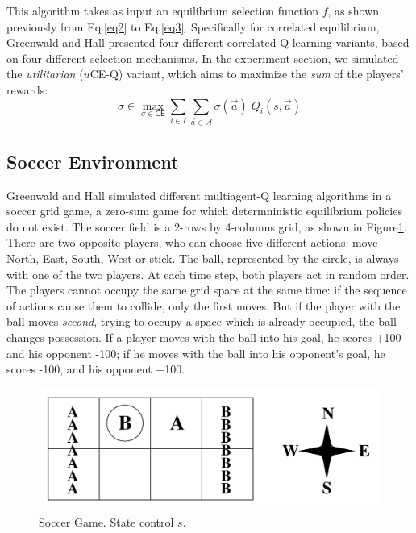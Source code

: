 \documentclass{article}
\begin{document}
    This algorithm takes as input an equilibrium selection function $f$, as shown previously from Eq.\ref{eq2} to Eq.\ref{eq3}.
    Specifically for correlated equilibrium, Greenwald and Hall presented four different correlated-Q learning variants, based on four different selection mechanisms.
    In the experiment section, we simulated the \emph{utilitarian} ($u$CE-Q) variant, which aims to maximize the \emph{sum} of the players' rewards:
    \begin{equation}
        \sigma \in \max_{\sigma \in \mathsf{CE}} \sum_{i \in I} \sum_{\vec{a} \in \mathcal{A}} \sigma(\vec{a}) \; Q_{i}(s, \vec{a})
    \end{equation}

    \subsection{Soccer Environment}
    \label{subsec:soccer}
    Greenwald and Hall simulated different multiagent-Q learning algorithms in a soccer grid game, a zero-sum game for which determninistic equilibrium policies do not exist.
    The soccer field is a 2-rows by 4-columns grid, as shown in Figure\ref{fig1}.
    There are two opposite players, who can choose five different actions: move North, East, South, West or stick.
    The ball, represented by the circle, is always with one of the two players.
    At each time step, both players act in random order.
    The players cannot occupy the same grid space at the same time: if the sequence of actions cause them to collide, only the first moves.
    But if the player with the ball moves \emph{second}, trying to occupy a space which is already occupied, the ball changes possession.
    If a player moves with the ball into his goal, he scores +100 and his opponent -100;
    if he moves with the ball into his opponent's goal, he scores -100, and his opponent +100.

    \begin{figure}[t]
        \includegraphics[scale=0.15]{./images/figure1.png}
        \centering
        \caption{Soccer Game.
        State control $s$.}
        \label{fig1}
    \end{figure}
\end{document}

